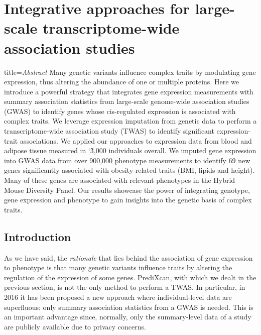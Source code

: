 \documentclass[../main.tex]{subfiles}
\begin{document}
\chapter{Integrative approaches for large-scale transcriptome-wide 
association studies}


\begin{external_abstract}{title=\textit{Abstract}}
Many genetic variants influence complex traits by modulating gene 
expression, thus altering the abundance of one or multiple proteins. 
Here we introduce a powerful strategy that integrates gene expression 
measurements with summary association statistics from large-scale 
genome-wide association studies (GWAS) to identify genes whose 
cis-regulated expression is associated with complex traits. We leverage 
expression imputation from genetic data to perform a transcriptome-wide 
association study (TWAS) to identify significant expression-trait 
associations. We applied our approaches to expression data from blood 
and adipose tissue measured in \char`\~3,000 individuals overall. We 
imputed gene expression into GWAS data from over 900,000 phenotype 
measurements to identify 69 new genes significantly associated with 
obesity-related traits (BMI, lipids and height). Many of these genes are 
associated with relevant phenotypes in the Hybrid Mouse Diversity Panel. 
Our results showcase the power of integrating genotype, gene expression 
and phenotype to gain insights into the genetic basis of complex traits.
\end{external_abstract}

\section{Introduction}

As we have said, the \textit{rationale} that lies behind the association 
of gene expression to phenotype is that many genetic variants influence 
traits by altering the regulation of the expression of some genes. 
PrediXcan, with which we dealt in the previous section, is not the only 
method to perform a TWAS. In particular, in 2016 it has been proposed a 
new approach where individual-level data are superfluous: only summary 
association statistics from 
a GWAS is needed. This is an important advantage since, normally, only 
the summary-level data of a study are publicly available due to privacy 
concerns.
\end{document}
